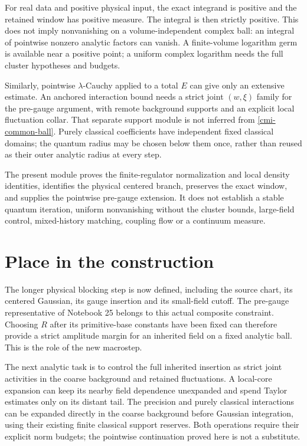 \documentclass[11pt]{article}
\theoremstyle{remark}
\begin{document}
For real data and positive physical input, the exact
integrand is positive and the retained window has positive
measure. The integral is then strictly positive. This
does not imply nonvanishing on a volume-independent
complex ball: an integral of pointwise nonzero analytic
factors can vanish. A finite-volume logarithm germ is
available near a positive point; a uniform complex
logarithm needs the full cluster hypotheses and budgets.

Similarly, pointwise $\lambda$-Cauchy applied to a total
$E$ can give only an extensive estimate. An anchored
interaction bound needs a strict joint $(w,\xi)$ family
for the pre-gauge argument, with remote background
supports and an explicit local fluctuation collar.
That separate support module is not inferred from
\eqref{cmi-common-ball}. Purely classical coefficients
have independent fixed classical domains; the quantum
radius may be chosen below them once, rather than
reused as their outer analytic radius at every step.

The present module proves the finite-regulator
normalization and local density identities, identifies
the physical centered branch, preserves the exact
window, and supplies the pointwise pre-gauge extension.
It does not establish a stable quantum iteration,
uniform nonvanishing without the cluster bounds,
large-field control, mixed-history matching, coupling
flow or a continuum measure.

\section{Place in the construction}

The longer physical blocking step is now defined, including the
source chart, its centered Gaussian, its gauge insertion and its
small-field cutoff. The pre-gauge representative of Notebook 25
belongs to this actual composite constraint. Choosing $R$ after its
primitive-base constants have been fixed can therefore provide a
strict amplitude margin for an inherited field on a fixed analytic
ball. This is the role of the new macrostep.

The next analytic task is to control the full inherited insertion
as strict joint activities in the coarse background and retained
fluctuations. A local-core expansion can keep its nearby field
dependence unexpanded and spend Taylor estimates only on its distant
tail. The precision and purely classical interactions can be
expanded directly in the coarse background before Gaussian
integration, using their existing finite classical support reserves.
Both operations require their explicit norm budgets; the pointwise
continuation proved here is not a substitute.
\end{document}
